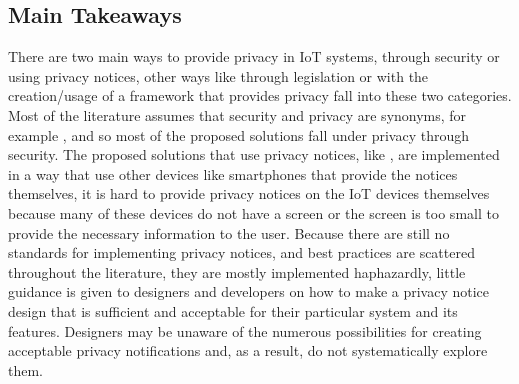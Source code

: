 
\subsection{Main Takeaways}

There are two main ways to provide privacy in IoT systems, through security
or using privacy notices, other ways like through legislation or with the
creation/usage of a framework that provides privacy fall into these two
categories. Most of the literature assumes that security and privacy are
synonyms, for example \cite{opara2022framework, FabianoInternet, SunSecure},
and so most of the proposed solutions fall under privacy through security.
The proposed solutions that use privacy notices, like \cite{FengDesign},
are implemented in a way that use other devices like smartphones that provide
the notices themselves, it is hard to provide privacy notices on the IoT
devices themselves because many of these devices do not have a screen or
the screen is too small to provide the necessary information to the user.
Because there are still no standards for implementing privacy notices, and
best practices are scattered throughout the literature, they are mostly
implemented haphazardly, little guidance is given to designers and developers
on how to make a privacy notice design that is sufficient and acceptable
for their particular system and its features. Designers may be unaware of
the numerous possibilities for creating acceptable privacy notifications
and, as a result, do not systematically explore them.

